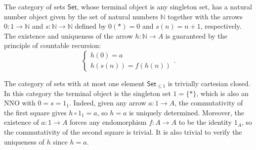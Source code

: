 \begin{example}
    The category of sets $\textsf{Set}$, whose terminal object is any singleton set, has a natural number object given by the set of natural numbers $\mathbb{N}$ together with the arrows $0 : 1 \to \mathbb{N}$ and $s : \mathbb{N} \to \mathbb{N}$
    defined by $0(*) = 0$ and $s(n) = n + 1$, respectively. The existence and uniqueness of the arrow $h : \mathbb{N} \to A$ is guaranteed by the principle of countable recursion:
    \[ \begin{cases}
        h(0) = a \\
        h(s(n)) = f(h(n))
    \end{cases}. \]
\end{example}

\begin{example}
    The category of sets with at most one element $\textsf{Set}_{\leq 1}$ is trivially cartesian closed. In this
    category the terminal object is the singleton set $1 = \{*\}$, which is also an NNO with $0 = s = 1_1$.
    Indeed, given any arrow $a : 1 \to A$, the commutativity of the first square gives $h \circ 1_1 = a$,
    so $h = a$ is uniquely determined. Moreover, the existence of $a : 1 \to A$ forces any endomorphism $f : A \to A$ to be the identity $1_A$,
    so the commutativity of the second square is trivial. It is also trivial to verify the uniqueness of $h$ since $h = a$.
\end{example}


